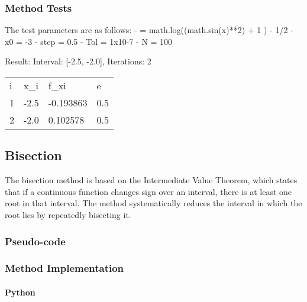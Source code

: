 \documentclass{article}
\begin{document}
    \subsubsection{Method Tests}\label{subsec:method-tests}

    The test parameters are as follows:
        - \textflorin = math.log((math.sin(x)**2) + 1 ) - 1/2
        - x0 = -3
        - step = 0.5
        - Tol = 1x10-7
        - N = 100

    Result:
        Interval: [-2.5, -2.0], Iterations: 2

        \begin{table}[ht]
        \begin{tabular}{llll}
        i & x\_i & f\_xi     & e   \\
        1 & -2.5 & -0.193863 & 0.5 \\
        2 & -2.0 & 0.102578  & 0.5
        \end{tabular}\label{tab:table}
        \end{table}

    \subsection{Bisection}\label{subsec:bisection}

    The bisection method is based on the Intermediate Value Theorem, which states that if a continuous function changes
    sign over an interval, there is at least one root in that interval. The method systematically reduces the interval
    in which the root lies by repeatedly bisecting it.

    \subsubsection{Pseudo-code}

    \subsubsection{Method Implementation}
    \paragraph{Python}
\end{document}
